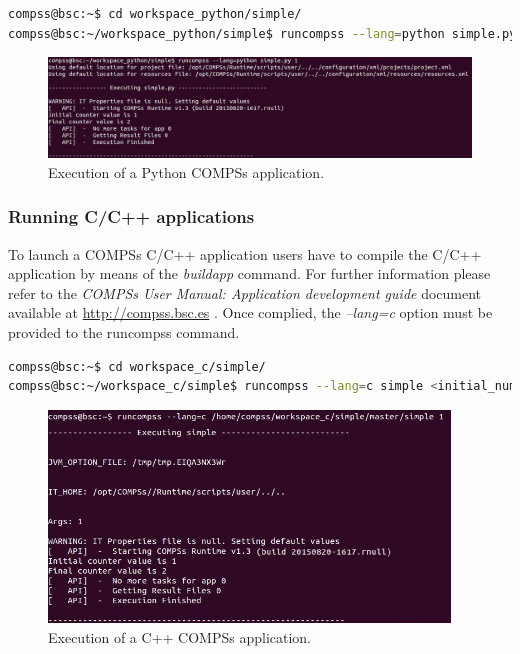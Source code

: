\begin{lstlisting}[language=bash]
compss@bsc:~$ cd workspace_python/simple/
compss@bsc:~/workspace_python/simple$ runcompss --lang=python simple.py <initial_number>
\end{lstlisting}

\begin{figure}[h!]
  \centering
    \includegraphics[width=\textwidth]{./Sections/2_Execution/Figures/python_execution.jpeg}
    \caption{Execution of a Python COMPSs application.}
    \label{fig:python_execution}
\end{figure}
\vspace{-0.4cm}


\subsubsection{Running C/C++ applications}
To launch a COMPSs C/C++ application users have to compile the C/C++ application by means of the \textit{buildapp} command. For 
further information please refer to the \textit{COMPSs User Manual: Application development guide} document available at \url{http://compss.bsc.es} . Once complied, 
the \textit{--lang=c} option must be provided to the runcompss command.

\begin{lstlisting}[language=bash]
compss@bsc:~$ cd workspace_c/simple/
compss@bsc:~/workspace_c/simple$ runcompss --lang=c simple <initial_number>
\end{lstlisting}

\begin{figure}[h!]
  \centering
    \includegraphics[width=0.95\textwidth]{./Sections/2_Execution/Figures/c_execution.jpeg}
    \caption{Execution of a C++ COMPSs application.}
    \label{fig:c_execution}
\end{figure}
\vspace{-0.4cm}


